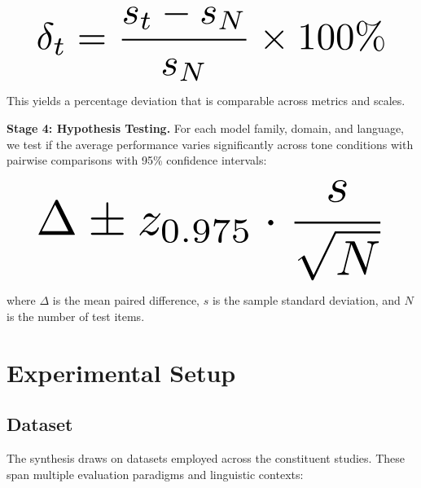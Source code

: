 \documentclass[conference]{IEEEtran}
\begin{document}
\begin{equation}
\resizebox{0.89\columnwidth}{!}{$\displaystyle \delta_{t} = \frac{s_t - s_N}{s_N} \times 100\%$}
\end{equation}

This yields a percentage deviation that is comparable across metrics and scales.

\textbf{Stage 4: Hypothesis Testing.} For each model family, domain, and language, we test if the average performance varies significantly across tone conditions with pairwise comparisons with 95\% confidence intervals:

\begin{equation}
\resizebox{0.89\columnwidth}{!}{$\displaystyle \Delta \pm z_{0.975} \cdot \frac{s}{\sqrt{N}}$}
\end{equation}

where $\Delta$ is the mean paired difference, $s$ is the sample standard deviation, and $N$ is the number of test items.

\section{Experimental Setup}

\subsection{Dataset}

The synthesis draws on datasets employed across the constituent studies. These span multiple evaluation paradigms and linguistic contexts:
\end{document}
